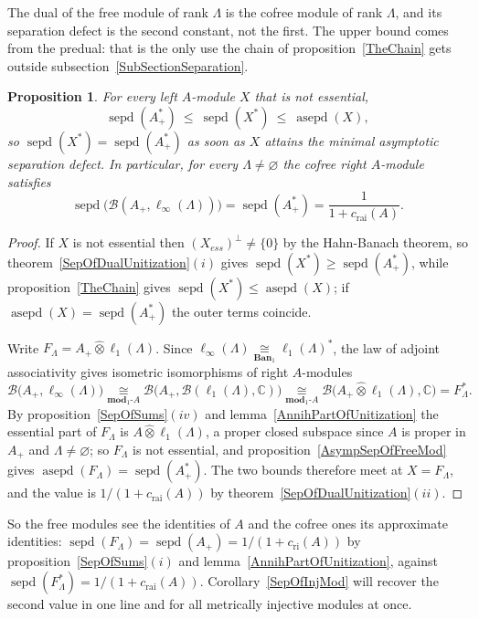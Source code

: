 \documentclass[11pt]{article}
\theoremstyle{plain}
\newtheorem{proposition}[theorem]{Proposition}
\theoremstyle{definition}
\newcommand{\projtens}{\mathbin{\widehat{\otimes}}}
\newcommand{\isom}[1]{\mathrel{\mathop{\cong}\limits_{#1}}}
\DeclareMathOperator{\sepd}{sepd}
\DeclareMathOperator{\asepd}{asepd}
\newcommand{\cri}{c_{\mathrm{ri}}}
\newcommand{\crai}{c_{\mathrm{rai}}}
\begin{document}
The dual of the free module of rank $\Lambda$ is the cofree module of rank
$\Lambda$, and its separation defect is the second constant, not the first. The
upper bound comes from the predual: that is the only use the chain of
proposition~\ref{TheChain} gets outside subsection~\ref{SubSectionSeparation}.

\begin{proposition}\label{SepOfCofreeMod}
For every left $A$-module $X$ that is not essential,
\[
\sepd(A_+^*)\ \leq\ \sepd(X^*)\ \leq\ \asepd(X) ,
\]
so $\sepd(X^*)=\sepd(A_+^*)$ as soon as $X$ attains the minimal asymptotic
separation defect. In particular, for every $\Lambda\neq\varnothing$ the cofree
right $A$-module satisfies
\[
\sepd \bigl(\mathcal{B}(A_+,\ell_\infty(\Lambda)) \bigr)=\sepd(A_+^*)
=\frac{1}{1+\crai(A)} .
\]
\end{proposition}

\begin{proof}
If $X$ is not essential then ${(X_{ess})}^\perp\neq \{0 \}$ by the Hahn-Banach
theorem, so theorem~\ref{SepOfDualUnitization}$(i)$ gives
$\sepd(X^*)\geq\sepd(A_+^*)$, while proposition~\ref{TheChain} gives
$\sepd(X^*)\leq\asepd(X)$; if $\asepd(X)=\sepd(A_+^*)$ the outer terms coincide.

Write $F_\Lambda=A_+\projtens\ell_1(\Lambda)$. Since
$\ell_\infty(\Lambda)\isom{\mathbf{Ban}_1}{\ell_1(\Lambda)}^*$, the law of
adjoint associativity gives isometric isomorphisms of right $A$-modules
\[
\mathcal{B} \bigl(A_+,\ell_\infty(\Lambda) \bigr)
\isom{\mathbf{mod}_1\text{-}A}
\mathcal{B} \bigl(A_+,\mathcal{B}(\ell_1(\Lambda),\mathbb{C}) \bigr)
\isom{\mathbf{mod}_1\text{-}A}
\mathcal{B} \bigl(A_+\projtens\ell_1(\Lambda),\mathbb{C} \bigr)=F_\Lambda^* .
\]
By proposition~\ref{SepOfSums}$(iv)$ and lemma~\ref{AnnihPartOfUnitization} the
essential part of $F_\Lambda$ is $A\projtens\ell_1(\Lambda)$, a proper closed
subspace since $A$ is proper in $A_+$ and $\Lambda\neq\varnothing$; so
$F_\Lambda$ is not essential, and
proposition~\ref{AsympSepOfFreeMod} gives $\asepd(F_\Lambda)=\sepd(A_+^*)$. The
two bounds therefore meet at $X=F_\Lambda$, and the value is
$1/(1+\crai(A))$ by theorem~\ref{SepOfDualUnitization}$(ii)$.
\end{proof}

So the free modules see the identities of $A$ and the cofree ones its
approximate identities:
$\sepd(F_\Lambda)=\sepd(A_+)=1/(1+\cri(A))$ by
proposition~\ref{SepOfSums}$(i)$ and lemma~\ref{AnnihPartOfUnitization}, against
$\sepd(F_\Lambda^*)=1/(1+\crai(A))$. Corollary~\ref{SepOfInjMod} will recover the
second value in one line and for all metrically injective modules at once.
\end{document}
